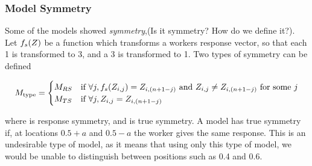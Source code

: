 




\subsubsection{Model Symmetry}
Some of the models showed \textit{symmetry},(Is it symmetry? How do we define it?). Let $f_{s}(Z)$
be a function which transforms a workers response vector, so that each 1 is transformed to 3, and a 3 is transformed to 1. Two types of symmetry can be defined


\[
M_\text{type}=
\begin{cases}

M_{RS} & \text{if } \forall j, f_{s}(Z_{i,j})=Z_{i,(n+1-j)} \text{ and }Z_{i,j}\neq Z_{i,(n+1-j)} \text{ for some } j  \\

M_{TS}      & \text{if } \forall j, Z_{i,j}=Z_{i,(n+1-j)}\\ 
 \end{cases}
\]

where \resSym is response symmetry, and \trueSym is true symmetry. A model has true symmetry if, at locations $0.5 + a$ and $0.5 - a$ the worker gives the same response. This is an undesirable type of model, as it means that using only this type of model, we would be unable to distinguish between positions such as 0.4 and 0.6.

